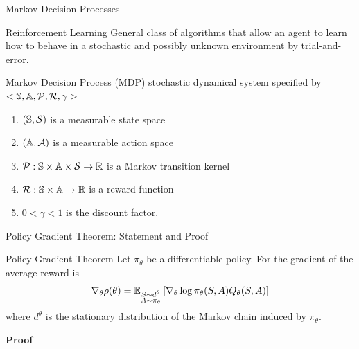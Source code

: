 \begin{frame}{Markov Decision Processes}
	\begin{block}{Reinforcement Learning}
		General class of algorithms that allow an agent to learn how to behave
		in a stochastic and possibly unknown environment by trial-and-error.
	\end{block}
	
	\begin{block}{Markov Decision Process (MDP)}
		stochastic dynamical system specified by $<\S, \A, \calP, \calR, \gamma>$
		\begin{enumerate}
			\item $(\S, \calS)$ is a measurable state space
			\item $(\A, \calA)$ is a measurable action space
			\item $\calP: \S \times \A \times \calS \to \R$ is a Markov transition kernel
			\item $\calR: \S \times \A \to \R$ is a reward function
			\item $0 < \gamma < 1$ is the discount factor.
		\end{enumerate}
	\end{block}
\end{frame}


\begin{frame}{Policy Gradient Theorem: Statement and Proof}

	\begin{block}{Policy Gradient Theorem}
	Let $\pi_\theta$ be a differentiable policy. For the gradient of the average reward is 
	\begin{equation*}
		\nabla_\theta \rho(\theta) =
		\E[\substack{S \sim d^\theta\\A \sim \pi_\theta}]{\nabla_\theta\log
		\pi_\theta(S,A) Q_{\theta}(S, A)}
	\end{equation*}
	where $d^\theta$ is the stationary distribution of the Markov chain induced by $\pi_\theta$. 
	\end{block}
	\textbf{Proof}\\
\end{frame}



